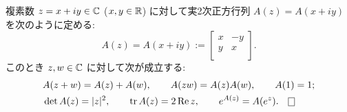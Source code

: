 \documentclass[12pt,twoside]{jarticle}
\begin{document}
\begin{question}[5点]
  \label{q:C->M2(R)}
  複素数 $z = x + iy\in{\mathbb C}$ ($x,y\in{\mathbb R}$) に対して実2次正方行列 $A(z)=A(x+iy)$ 
  を次のように定める:
  \begin{equation*}
    A(z) = A(x+iy) :=
    \begin{bmatrix}
      x & -y \\
      y &  x \\
    \end{bmatrix}.
  \end{equation*}
  このとき $z,w\in{\mathbb C}$ に対して次が成立する:
  \begin{align*}
    &
    A(z+w) = A(z) + A(w), \qquad
    A(zw) = A(z)A(w), \qquad
    A(1) = 1;
    \\ &
    \det A(z) = |z|^2, \qquad
    \trace A(z) = 2\Repart z, \qquad
    e^{A(z)} = A(e^z).
    \qed
  \end{align*}
\end{question}

\end{document}
